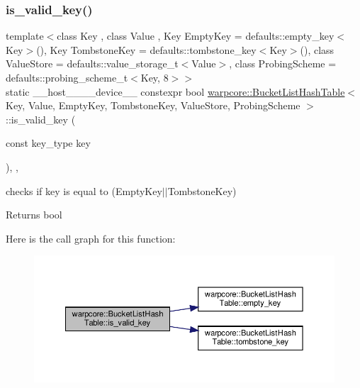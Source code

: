 \subsubsection{\texorpdfstring{is\+\_\+valid\+\_\+key()}{is\_valid\_key()}}
{\footnotesize\ttfamily template$<$class Key , class Value , Key Empty\+Key = defaults\+::empty\+\_\+key$<$\+Key$>$(), Key Tombstone\+Key = defaults\+::tombstone\+\_\+key$<$\+Key$>$(), class Value\+Store  = defaults\+::value\+\_\+storage\+\_\+t$<$\+Value$>$, class Probing\+Scheme  = defaults\+::probing\+\_\+scheme\+\_\+t$<$\+Key, 8$>$$>$ \\
static \+\_\+\+\_\+host\+\_\+\+\_\+\+\_\+\+\_\+device\+\_\+\+\_\+ constexpr bool \hyperlink{classwarpcore_1_1BucketListHashTable}{warpcore\+::\+Bucket\+List\+Hash\+Table}$<$ Key, Value, Empty\+Key, Tombstone\+Key, Value\+Store, Probing\+Scheme $>$\+::is\+\_\+valid\+\_\+key (\begin{DoxyParamCaption}\item[{const key\+\_\+type}]{key }\end{DoxyParamCaption})\hspace{0.3cm}{\ttfamily [inline]}, {\ttfamily [static]}, {\ttfamily [noexcept]}}



checks if {\ttfamily key} is equal to {\ttfamily }(Empty\+Key$\vert$$\vert$\+Tombstone\+Key) 

\begin{DoxyReturn}{Returns}
{\ttfamily bool} 
\end{DoxyReturn}
Here is the call graph for this function\+:
\nopagebreak
\begin{figure}[H]
\begin{center}
\leavevmode
\includegraphics[width=350pt]{classwarpcore_1_1BucketListHashTable_aa5a011b8623deb47def1b8e029869f06_cgraph}
\end{center}
\end{figure}
\mbox{\label{classwarpcore_1_1BucketListHashTable_a7902d5c984290d262f5964f55a666765}} 
